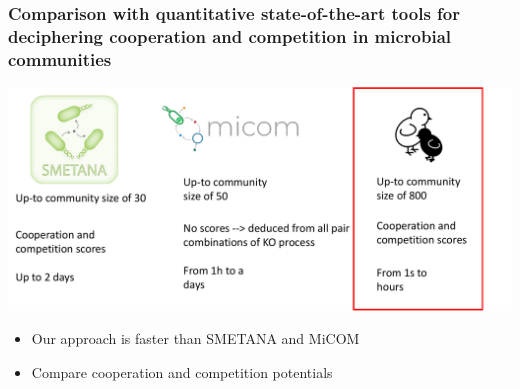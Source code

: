 \documentclass[8pt,usenames,dvipsnames]{beamer}
\begin{document}
\begin{frame}
\frametitle{Comparison with quantitative state-of-the-art tools for deciphering cooperation and competition in microbial communities}
\includegraphics[width=\textwidth]{figures/comparaison-sota-coop-comp.pdf}
\begin{block}{}
\begin{itemize}
\item Our approach is faster than SMETANA \tiny \citep{Zelezniak2015} \normalsize and MiCOM \tiny \citep{diener2020}
\item \normalsize Compare cooperation and competition potentials
\end{itemize}
\end{block}
\end{frame}
\end{document}

